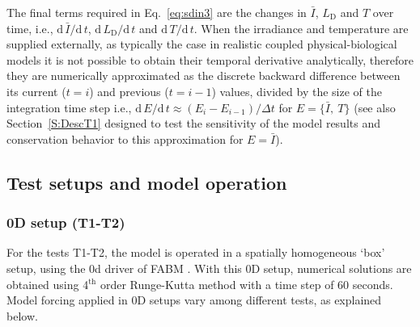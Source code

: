 \documentclass[gmd, manuscript, draft]{copernicus}
\begin{document}
The final terms required in Eq.~\eqref{eq:sdin3} are the changes in $\bar{I}$, $L_{\text{D}}$ and $T$ over time, i.e., $\text{d}\,\bar{I} / \text{d}\,t$, $\text{d}\,L_{\text{D}} / \text{d}\,t$ 
and $\text{d}\,T / \text{d}\,t$. 
When the irradiance and temperature are supplied externally, as typically the case in realistic coupled physical-biological models it is not possible to obtain their temporal derivative analytically, therefore they are numerically approximated as the discrete backward difference between its current ($t=i$) and previous ($t=i-1$) values, divided by the size of the integration time step i.e., $\text{d}\, E / \text{d}\, t \approx (E_{i} - E_{i-1}) / \Delta t$ for $E=\{\bar{I},\ T\}$ (see also Section~\ref{S:DescT1} designed to test the sensitivity of the model results and conservation behavior to this approximation for $E=\bar{I}$).

\subsection{Test setups and model operation}\label{S:DescSetup}
\subsubsection{0D setup (T1-T2)}
    For the tests T1-T2, the model is operated in a spatially homogeneous `box' setup, using the 0d driver of FABM \citep{Bruggeman2014}. With this 0D setup, numerical solutions are obtained using 4$^\text{th}$ order Runge-Kutta method with a time step of 60 seconds. Model forcing applied in 0D setups vary among different tests, as explained below.
\end{document}
